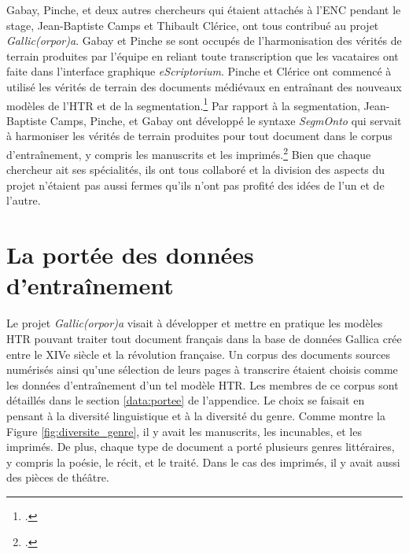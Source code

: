 \documentclass[class=article, crop=false]{standalone}
\begin{document}
Gabay, Pinche, et deux autres chercheurs qui étaient attachés à l'\acrlong{ENC} pendant le stage, Jean-Baptiste Camps et Thibault Clérice, ont tous contribué au projet \textit{Gallic(orpor)a}. Gabay et Pinche se sont occupés de l'harmonisation des vérités de terrain produites par l'équipe en reliant toute transcription que les vacataires ont faite dans l'interface graphique \textit{eScriptorium}. Pinche et Clérice ont commencé à utilisé les vérités de terrain des documents médiévaux en entraînant des nouveaux modèles de l'\acrshort{HTR} et de la segmentation.\footcite{clericeYALTAiSegmontoManuscript2022} Par rapport à la segmentation, Jean-Baptiste Camps, Pinche, et Gabay ont développé le syntaxe \textit{SegmOnto} qui servait à harmoniser les vérités de terrain produites pour tout document dans le corpus d'entraînement, y compris les manuscrits et les imprimés.\footcite{gabaySegmOntoCommonVocabulary2021} Bien que chaque chercheur ait ses spécialités, ils ont tous collaboré et la division des aspects du projet n'étaient pas aussi fermes qu'ils n'ont pas profité des idées de l'un et de l'autre.

\section{La portée des données d'entraînement}
\label{veritesDeTerrain}
Le projet \textit{Gallic(orpor)a} visait à développer et mettre en pratique les modèles \acrshort{HTR} pouvant traiter tout document français dans la base de données Gallica crée entre le XIVe siècle et la révolution française. Un corpus des documents sources numérisés ainsi qu'une sélection de leurs pages à transcrire étaient choisis comme les données d'entraînement d'un tel modèle \acrshort{HTR}. Les membres de ce corpus sont détaillés dans le section \ref{data:portee} de l'appendice. Le choix se faisait en pensant à la diversité linguistique et à la diversité du genre. Comme montre la Figure \ref{fig:diversite_genre}, il y avait les manuscrits, les incunables, et les imprimés. De plus, chaque type de document a porté plusieurs genres littéraires, y compris la poésie, le récit, et le traité. Dans le cas des imprimés, il y avait aussi des pièces de théâtre.
\end{document}
